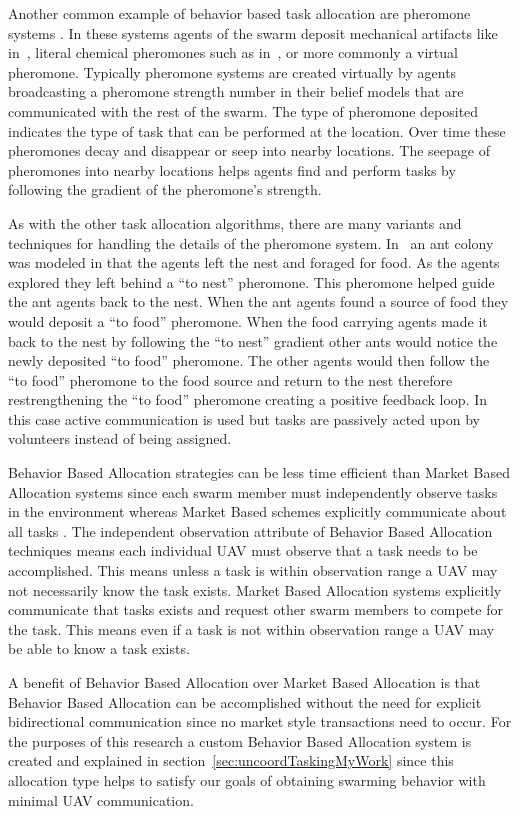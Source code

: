 Another common example of behavior based task allocation are pheromone systems \parencite{p2p_pheromone, manet_pheromone}.  In these systems agents of the swarm deposit mechanical artifacts like in~\textcite{beacon_pheromone}, literal chemical pheromones such as in~\textcite{ethanol_swarm}, or more commonly a virtual pheromone.  Typically pheromone systems are created virtually by agents broadcasting a pheromone strength number in their belief models that are communicated with the rest of the swarm. The type of pheromone deposited indicates the type of task that can be performed at the location.  Over time these pheromones decay and disappear or seep into nearby locations.  The seepage of pheromones into nearby locations helps agents find and perform tasks by following the gradient of the pheromone's strength.

As with the other task allocation algorithms, there are many variants and techniques for handling the details of the pheromone system.  In~\textcite{pheromone} an ant colony was modeled in that the agents left the nest and foraged for food.  As the agents explored they left behind a ``to nest'' pheromone.  This pheromone helped guide the ant agents back to the nest.  When the ant agents found a source of food they would deposit a ``to food'' pheromone.  When the food carrying agents made it back to the nest by following the ``to nest'' gradient other ants would notice the newly deposited ``to food'' pheromone.  The other agents would then follow the ``to food'' pheromone to the food source and return to the nest therefore restrengthening the ``to food'' pheromone creating a positive feedback loop.  In this case active communication is used but tasks are passively acted upon by volunteers instead of being assigned.

Behavior Based Allocation strategies can be less time efficient than Market Based Allocation systems since each swarm member must independently observe tasks in the environment whereas Market Based schemes explicitly communicate about all tasks \parencite{bba_vs_mba_1, bba_vs_mba_2}.  The independent observation attribute of Behavior Based Allocation techniques means each individual UAV must observe that a task needs to be accomplished.  This means unless a task is within observation range a UAV may not necessarily know the task exists.  Market Based Allocation systems explicitly communicate that tasks exists and request other swarm members to compete for the task.  This means even if a task is not within observation range a UAV may be able to know a task exists.

A benefit of Behavior Based Allocation over Market Based Allocation is that Behavior Based Allocation can be accomplished without the need for explicit bidirectional communication since no market style transactions need to occur.  For the purposes of this research a custom Behavior Based Allocation system is created and explained in section~\ref{sec:uncoordTaskingMyWork} since this allocation type helps to satisfy our goals of obtaining swarming behavior with minimal UAV communication.